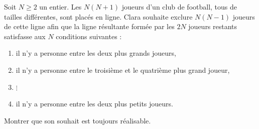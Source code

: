 Soit $N \geqslant 2$ un entier. Les $N(N+1)$ joueurs d'un club de football, tous de tailles différentes, sont
placés en ligne. Clara souhaite exclure $N(N-1)$ joueurs de cette ligne afin que la ligne résultante formée par
les $2N$ joueurs restants satisfasse aux $N$ conditions suivantes :
\begin{enumerate}
  \item[(1)] il n'y a personne entre les deux plus grands joueurs,
  \item[(2)] il n'y a personne entre le troisième et le quatrième plus grand joueur,
  \item[] $\vdots$
  \item[($N$)] il n'y a personne entre les deux plus petits joueurs.
\end{enumerate}
Montrer que son souhait est toujours réalisable.
